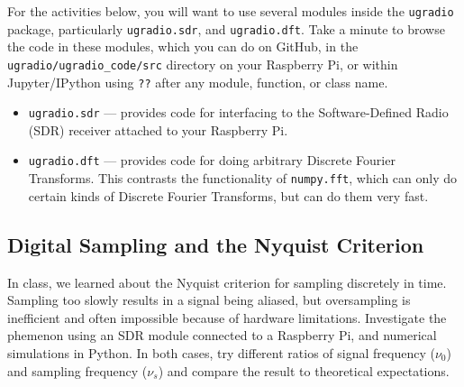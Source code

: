 \documentclass[11pt,preprint]{aastex}
\begin{document}
For the activities below, you will want to use several modules 
inside the {\tt ugradio} package, particularly {\tt ugradio.sdr},
and {\tt ugradio.dft}.
Take a minute to browse the code in these modules, which you can do
on GitHub, in the {\tt ugradio/ugradio\_code/src} directory on
your Raspberry Pi, or within Jupyter/IPython using {\tt ??} after
any module, function, or class name.

\begin{itemize}


\item {\tt ugradio.sdr} --- provides code for interfacing to the Software-Defined
Radio (SDR) receiver attached to your Raspberry Pi.

\item {\tt ugradio.dft} --- provides code for doing arbitrary Discrete Fourier Transforms.  This
contrasts the functionality of {\tt numpy.fft}, which can only do certain kinds of
Discrete Fourier Transforms, but can do them very fast.




\end{itemize}


\subsection{Digital Sampling and the Nyquist Criterion}

\noindent
%
In class, we learned about the 
Nyquist criterion for sampling discretely in time. 
Sampling too slowly results in a signal being aliased, but oversampling
is inefficient and often impossible because of hardware limitations.
Investigate the phemenon using an SDR module connected to a 
Raspberry Pi, and numerical simulations in Python.
In both cases, try different ratios of 
signal frequency ($\nu_0$) and sampling frequency ($\nu_s$) and compare
the result to theoretical expectations.
\end{document}

